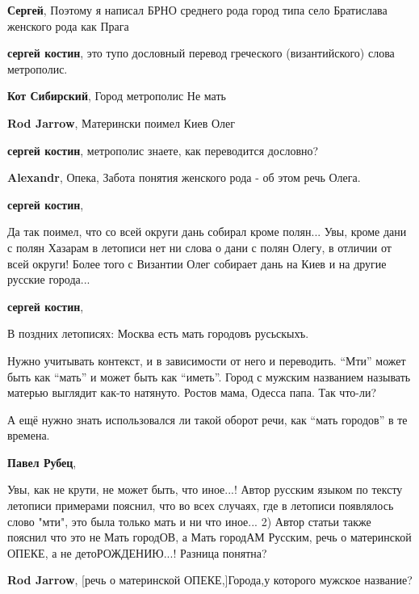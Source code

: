 \begin{itemize}
\begin{itemize}
\textbf{Сергей}, Поэтому я написал БРНО среднего рода город типа село Братислава женского рода как Прага

\textbf{сергей костин}, это тупо дословный перевод греческого (византийского) слова метрополис.

\textbf{Кот Сибирский}, Город метрополис Не мать

\textbf{Rod Jarrow}, Матерински поимел Киев Олег

\textbf{сергей костин}, метрополис знаете, как переводится дословно?

\textbf{Alexandr}, Опека, Забота понятия женского рода - об этом речь Олега.

\textbf{сергей костин}, 

Да так поимел, что со всей округи дань собирал кроме полян... Увы, кроме дани с
полян Хазарам в летописи нет ни слова о дани с полян Олегу, в отличии от всей
округи! Более того с Византии Олег собирает дань на Киев и на другие русские
города...

\textbf{сергей костин}, 

В поздних летописях: Москва есть мать городовъ русьскыхъ.

\end{itemize} %


Нужно учитывать контекст, и в зависимости от него и переводить. \enquote{Мти} может быть
как \enquote{мать} и может быть как \enquote{иметь}. Город с мужским названием называть матерью
выглядит как-то натянуто. Ростов мама, Одесса папа. Так что-ли?

А ещё нужно знать использовался ли такой оборот речи, как \enquote{мать городов} в те
времена.

\begin{itemize} %
\textbf{Павел Рубец}, 

Увы, как не крути, не может быть, что иное...! Автор русским языком по тексту
летописи примерами пояснил, что во всех случаях, где в летописи появлялось
слово "мти", это была только мать и ни что иное... 2) Автор статьи также
пояснил что это не Мать городОВ, а Мать городАМ Русским, речь о материнской
ОПЕКЕ, а не детоРОЖДЕНИЮ...! Разница понятна?

\textbf{Rod Jarrow}, [речь о материнской ОПЕКЕ,]Города,у которого мужское название?


\end{itemize}
\end{itemize}
